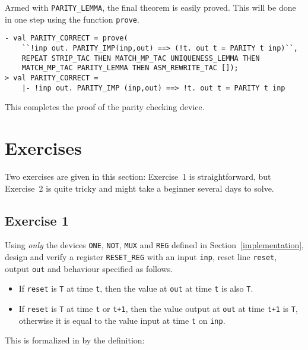 Armed with {\small\verb|PARITY_LEMMA|}, the final theorem is easily
proved.  This will be done in one step using the \ML{} function
{\small\verb|prove|}.

\begin{session}
\begin{verbatim}
- val PARITY_CORRECT = prove(
    ``!inp out. PARITY_IMP(inp,out) ==> (!t. out t = PARITY t inp)``,
    REPEAT STRIP_TAC THEN MATCH_MP_TAC UNIQUENESS_LEMMA THEN
    MATCH_MP_TAC PARITY_LEMMA THEN ASM_REWRITE_TAC []);
> val PARITY_CORRECT =
    |- !inp out. PARITY_IMP (inp,out) ==> !t. out t = PARITY t inp
\end{verbatim}
\end{session}

\noindent This completes the proof of the
parity checking device.

\section{Exercises}
\label{exercises}

Two exercises are given in this section: Exercise~1 is
straightforward, but Exercise~2 is quite tricky and might take a
beginner several days to solve.

\subsection{Exercise 1}

Using {\it only\/} the devices {\small\verb|ONE|}, {\small\verb|NOT|},
{\small\verb|MUX|} and {\small\verb|REG|} defined in
Section~\ref{implementation}, design and verify a register
{\small\verb|RESET_REG|} with an input {\small\verb|inp|}, reset line
{\small\verb|reset|}, output {\small\verb|out|} and behaviour
specified as follows.
\begin{itemize}
\item If {\small\verb|reset|} is {\small\verb|T|} at time
  {\small\verb|t|}, then the value at {\small\verb|out|} at time
  {\small\verb|t|} is also {\small\verb|T|}.
\item If {\small\verb|reset|} is {\small\verb|T|} at time
  {\small\verb|t|} or {\small\verb|t+1|}, then the value output at
  {\small\verb|out|} at time {\small\verb|t+1|} is {\small\verb|T|},
  otherwise it is equal to the value input at time {\small\verb|t|} on
  {\small\verb|inp|}.
\end{itemize}
This is formalized in \HOL{} by the definition:

